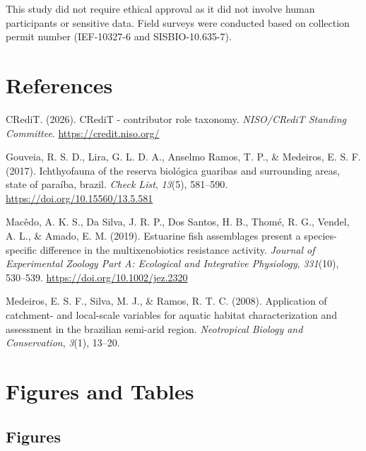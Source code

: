 \documentclass[
  american,
  letterpaper,
  DIV=11,
  numbers=noendperiod]{scrartcl}
\newlength{\cslhangindent}
\newenvironment{CSLReferences}[2] %
 {\begin{list}{}{%
  \setlength{\itemindent}{0pt}
  \setlength{\leftmargin}{0pt}
  \setlength{\parsep}{0pt}
  \ifodd #1
   \setlength{\leftmargin}{\cslhangindent}
   \setlength{\itemindent}{-1\cslhangindent}
  \fi
  \setlength{\itemsep}{#2\baselineskip}}}
 {\end{list}}
\begin{document}
This study did not require ethical approval as it did not involve human
participants or sensitive data. Field surveys were conducted based on
collection permit number (IEF-10327-6 and SISBIO-10.635-7).

\section*{References}\label{references}

\protect{}\label{refs}
\begin{CSLReferences}{1}{0}
CRediT. (2026). CRediT - contributor role taxonomy. \emph{NISO/CRediT
Standing Committee}. \url{https://credit.niso.org/}

Gouveia, R. S. D., Lira, G. L. D. A., Anselmo Ramos, T. P., \& Medeiros,
E. S. F. (2017). Ichthyofauna of the reserva biológica guaribas and
surrounding areas, state of paraíba, brazil. \emph{Check List},
\emph{13}(5), 581--590. \url{https://doi.org/10.15560/13.5.581}

Macêdo, A. K. S., Da Silva, J. R. P., Dos Santos, H. B., Thomé, R. G.,
Vendel, A. L., \& Amado, E. M. (2019). Estuarine fish assemblages
present a species{-}specific difference in the multixenobiotics
resistance activity. \emph{Journal of Experimental Zoology Part A:
Ecological and Integrative Physiology}, \emph{331}(10), 530--539.
\url{https://doi.org/10.1002/jez.2320}

Medeiros, E. S. F., Silva, M. J., \& Ramos, R. T. C. (2008). Application
of catchment- and local-scale variables for aquatic habitat
characterization and assessment in the brazilian semi-arid region.
\emph{Neotropical Biology and Conservation}, \emph{3}(1), 13--20.

\end{CSLReferences}

\pagebreak
\newpage

\section*{Figures and Tables}\label{figures-and-tables}

\subsection*{Figures}\label{figures}
\end{document}
